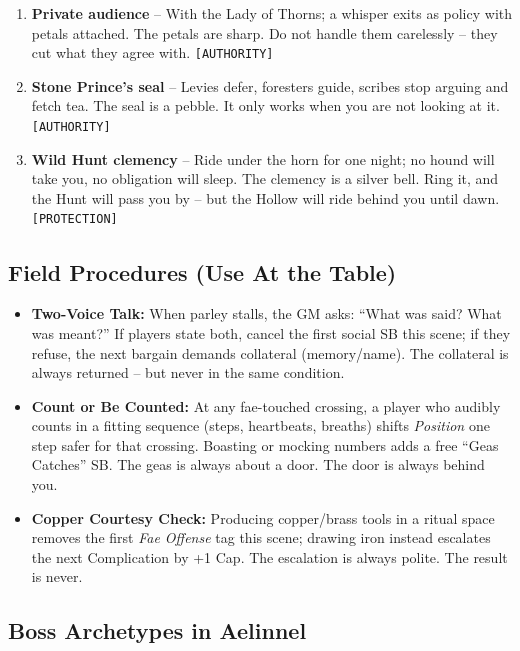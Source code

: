 \begin{enumerate}
\item[Q] \textbf{Private audience} -- With the Lady of Thorns; a whisper exits as policy with petals attached. The petals are sharp. Do not handle them carelessly -- they cut what they agree with. \texttt{[AUTHORITY]}
\item[K] \textbf{Stone Prince's seal} -- Levies defer, foresters guide, scribes stop arguing and fetch tea. The seal is a pebble. It only works when you are not looking at it. \texttt{[AUTHORITY]}
\item[A] \textbf{Wild Hunt clemency} -- Ride under the horn for one night; no hound will take you, no obligation will sleep. The clemency is a silver bell. Ring it, and the Hunt will pass you by -- but the Hollow will ride behind you until dawn. \texttt{[PROTECTION]}
\end{enumerate}

\subsection*{Field Procedures (Use At the Table)}
\begin{itemize}
\item \textbf{Two-Voice Talk:} When parley stalls, the GM asks: ``What was said? What was meant?'' If players state both, cancel the first social SB this scene; if they refuse, the next bargain demands collateral (memory/name). The collateral is always returned -- but never in the same condition.
\item \textbf{Count or Be Counted:} At any fae-touched crossing, a player who audibly counts in a fitting sequence (steps, heartbeats, breaths) shifts \emph{Position} one step safer for that crossing. Boasting or mocking numbers adds a free ``Geas Catches'' SB. The geas is always about a door. The door is always behind you.
\item \textbf{Copper Courtesy Check:} Producing copper/brass tools in a ritual space removes the first \emph{Fae Offense} tag this scene; drawing iron instead escalates the next Complication by +1 Cap. The escalation is always polite. The result is never.
\end{itemize}

\subsection*{Boss Archetypes in Aelinnel}
\label{sec:aelinnel-bosses}

